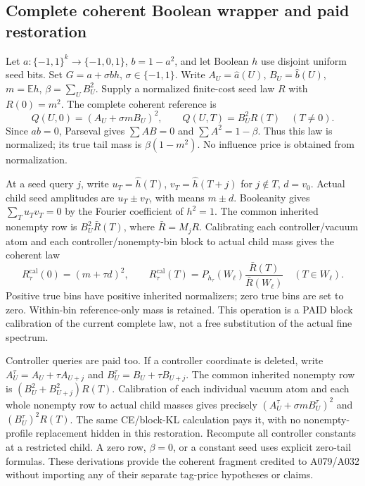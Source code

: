 \documentclass[11pt]{article}
\newcommand{\E}{\mathbb E}
\begin{document}
\subsection{Complete coherent Boolean wrapper and paid restoration}
\label{sec:coherent9}
Let $a:\{-1,1\}^k\to\{-1,0,1\}$, $b=1-a^2$, and let Boolean
$h$ use disjoint uniform seed bits. Set $G=a+\sigma bh$, $\sigma\in\{-1,1\}$.
Write $A_U=\widehat a(U)$, $B_U=\widehat b(U)$, $m=\E h$,
$\beta=\sum_U B_U^2$. Supply a normalized finite-cost seed law $R$
with $R(0)=m^2$. The complete coherent reference is
\[
Q(U,0)=(A_U+\sigma mB_U)^2,\qquad
Q(U,T)=B_U^2R(T)\quad(T\ne0).
\tag{CQ9}\label{eq:coherent9}
\]
Since $ab=0$, Parseval gives $\sum AB=0$ and
$\sum A^2=1-\beta$. Thus this law is normalized; its true tail
mass is $\beta(1-m^2)$. No influence price is obtained from normalization.

At a seed query $j$, write $u_T=\widehat h(T)$,
$v_T=\widehat h(T+j)$ for $j\notin T$, $d=v_0$.
Actual child seed amplitudes are $u_T\pm v_T$, with means $m\pm d$.
Booleanity gives $\sum_Tu_Tv_T=0$ by the Fourier coefficient of $h^2=1$.
The common inherited nonempty row is $B_U^2\bar R(T)$, where
$\bar R=M_jR$. Calibrating each controller/vacuum atom and each
controller/nonempty-bin block to actual child mass gives the coherent law
\[
R^{\mathrm{cal}}_\tau(0)=(m+\tau d)^2,\qquad
R^{\mathrm{cal}}_\tau(T)=P_{h_\tau}(W_\ell)
\frac{\bar R(T)}{\bar R(W_\ell)}\quad(T\in W_\ell).
\]
Positive true bins have positive inherited normalizers; zero true bins
are set to zero. Within-bin reference-only mass is retained. This
operation is a PAID block calibration of the current complete law,
not a free substitution of the actual fine spectrum.

Controller queries are paid too. If a controller coordinate is deleted,
write $A^\tau_U=A_U+\tau A_{U+j}$ and $B^\tau_U=B_U+\tau B_{U+j}$.
The common inherited nonempty row is
$(B_U^2+B_{U+j}^2)R(T)$. Calibration of each individual vacuum atom
and each whole nonempty row to actual child masses gives precisely
$(A^\tau_U+\sigma mB^\tau_U)^2$ and $(B^\tau_U)^2R(T)$.
The same CE/block-KL calculation pays it, with no nonempty-profile
replacement hidden in this restoration. Recompute all controller
constants at a restricted child. A zero row, $\beta=0$, or a constant
seed uses explicit zero-tail formulas. These derivations provide the
coherent fragment credited to A079/A032 without importing any of
their separate tag-price hypotheses or claims.
\end{document}
